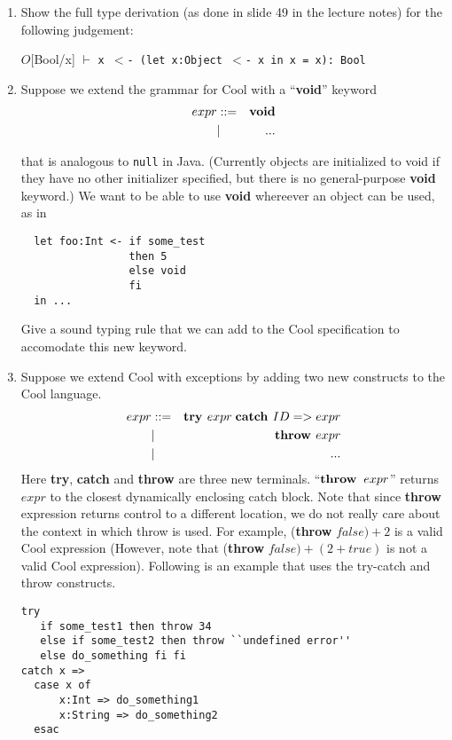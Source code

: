 \documentclass{article}
\begin{document}
\begin{enumerate}

\item Show the full type derivation (as done in slide 49 in the
  lecture notes) for the following judgement:

\begin{center}
$O$[Bool/x] $\vdash$ \tt{x $<$- (let x:Object $<$- x in x = x): Bool}
\end{center}


\item Suppose we extend the grammar for Cool with a ``{\bf void}'' keyword
\begin{eqnarray*}
  expr & ::= & {\bf void} \\
       & |   & ...
\end{eqnarray*}

  that is analogous to {\tt null} in Java. (Currently objects are
  initialized to void if they have no other initializer specified, but
  there is no general-purpose {\bf void} keyword.)  We want to be able
  to use {\bf void} whereever an object can be used, as in
\begin{verbatim}
  let foo:Int <- if some_test 
                 then 5 
                 else void 
                 fi 
  in ...
\end{verbatim}

  Give a sound typing rule that we can add to the Cool specification
  to accomodate this new keyword.

\item Suppose we extend Cool with exceptions by adding two new constructs 
to the Cool language.  
\begin{eqnarray*}
  expr & ::= & \textit{\bf try } expr \;\textit{\bf catch } ID => expr \\
       & |   & \textit{\bf throw } expr \\
       & | & ...
\end{eqnarray*}
Here {\bf try}, {\bf catch} and {\bf throw} are three new terminals. 
  ``${\bf throw }\;\; expr$'' returns $expr$ to the
  closest dynamically enclosing catch block. 
Note that since {\bf throw} expression returns control to a different location, we do not really
  care about the context in which throw is used. For example, 
({\bf throw} $false) + 2$ is a valid Cool expression (However, note that
  ({\bf throw} $false) + (2+true)$ is not a valid Cool expression).  Following is an
  example that uses the try-catch and throw constructs. 
\newpage
\begin{verbatim}
try 
   if some_test1 then throw 34
   else if some_test2 then throw ``undefined error''
   else do_something fi fi
catch x =>
  case x of 
      x:Int => do_something1
      x:String => do_something2
  esac
\end{verbatim}


\end{enumerate}
\end{document}

